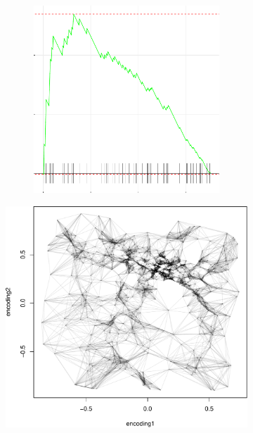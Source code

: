 \documentclass{article}
\begin{document}
\begin{figure}
\begin{subfigure}[b]{0.2\textwidth}
\begin{subfigure}[b]{\textwidth}
			\caption{}
			\label{}
		\end{subfigure}
		\begin{subfigure}[b]{\textwidth}
			\includegraphics[width=\textwidth]{interaction_enrichment.pdf}

			\caption{}
			\label{}
		\end{subfigure}
		

	\end{subfigure} 
	\begin{subfigure}[b]{0.4\textwidth}
		\includegraphics[width=\textwidth]{knn.pdf}


\end{subfigure}
\end{figure}
\end{document}
